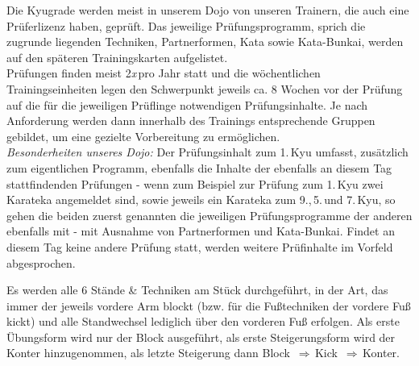 \begin{tcolorbox}
\begin{center}
{\begin{center}
		\end{center}
		
		Die Kyugrade werden meist in unserem Dojo von unseren Trainern, die auch eine Prüferlizenz haben, geprüft. Das jeweilige Prüfungsprogramm, sprich die zugrunde liegenden Techniken, Partnerformen, Kata sowie Kata-Bunkai, werden auf den späteren Trainingskarten aufgelistet.\\
		
		Prüfungen finden meist 2\textit{x}\,pro Jahr statt und die wöchentlichen Trainingseinheiten legen den Schwerpunkt jeweils ca. 8 Wochen vor der Prüfung auf die für die jeweiligen Prüflinge notwendigen Prüfungsinhalte. Je nach Anforderung werden dann innerhalb des Trainings entsprechende Gruppen gebildet, um eine gezielte Vorbereitung zu ermöglichen.\\
		
		\textit{Besonderheiten unseres Dojo:} Der Prüfungsinhalt zum 1.\,Kyu umfasst, zusätzlich zum eigentlichen Programm, ebenfalls die Inhalte der ebenfalls an diesem Tag stattfindenden Prüfungen - wenn zum Beispiel zur Prüfung zum 1.\,Kyu zwei Karateka angemeldet sind, sowie jeweils ein Karateka zum 9.,\,5.\,und 7.\,Kyu, so gehen die beiden zuerst genannten die jeweiligen Prüfungsprogramme der anderen ebenfalls mit - mit Ausnahme von Partnerformen und Kata-Bunkai. Findet an diesem Tag keine andere Prüfung statt, werden weitere Prüfinhalte im Vorfeld abgesprochen.
	}
\end{center}\null\vfill\null
\end{tcolorbox}
\clearpage
\pagebreak
\setcounter{num}{0}
\setcounter{numz}{0}
\setlength{\tabcolsep}{3pt}		
\begin{tcolorbox}[width=\textwidth,height=\textheight,right=12pt,left=12pt,colframe=GKD,colback=white,fonttitle=\bfseries,coltitle=white,title={Allgemeines:\indent Grundsätzliche Bewerungshorizonte für Unterstufe, Mittelstufe und Oberstufe}]
	\null\vfill\null
	\begin{center}
		\parbox{\textwidth-2\tabcolsep}{Es werden alle 6 Stände \& Techniken am Stück durchgeführt, in der Art, das immer der jeweils vordere Arm blockt (bzw. für die Fußtechniken der vordere Fuß kickt) und alle Standwechsel lediglich über den vorderen Fuß erfolgen. Als erste Übungsform wird nur der Block ausgeführt, als erste Steigerungsform wird der Konter hinzugenommen, als letzte Steigerung dann \mbox{Block \(\Rightarrow\)\,Kick \(\Rightarrow\)\,Konter.}}
	\end{center}\null\vfill\null
\end{tcolorbox}
\clearpage
\pagebreak
